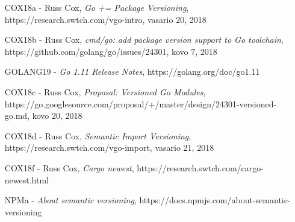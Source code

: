 
\begin{itemize}
    \item [COX18a] - Russ Cox, \emph{Go += Package Versioning}, https://research.swtch.com/vgo-intro, vasario 20, 2018
    \item [COX18b] - Russ Cox, \emph{cmd/go: add package version support to Go toolchain}, https://github.com/golang/go/issues/24301, kovo 7, 2018
    \item [GOLANG19] - \emph{Go 1.11 Release Notes}, https://golang.org/doc/go1.11
    \item [COX18c] - Russ Cox, \emph{Proposal: Versioned Go Modules}, https://go.googlesource.com/proposal/+/master/design/24301-versioned-go.md, kovo 20, 2018
    \item [COX18d] - Russ Cox, \emph{Semantic Import Versioning}, https://research.swtch.com/vgo-import, vasario 21, 2018
    \item [COX18f] - Russ Cox, \emph{Cargo newest}, https://research.swtch.com/cargo-newest.html
    \item[NPMa] - \emph{About semantic versioning}, https://docs.npmjs.com/about-semantic-versioning
\end{itemize}

